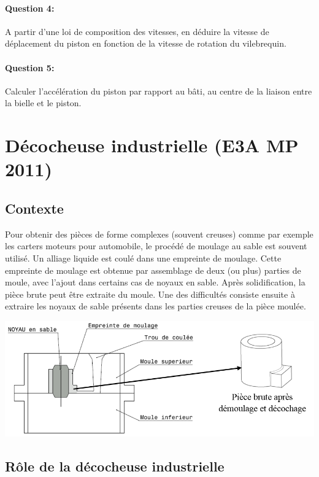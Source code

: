\paragraph{Question 4:} A partir d'une loi de composition des vitesses, en déduire la vitesse de déplacement du piston en fonction de la vitesse de rotation du vilebrequin.

\paragraph{Question 5:} Calculer l'accélération du piston par rapport au bâti, au centre de la liaison entre la bielle et le piston.

\newpage

\section{Décocheuse industrielle (E3A MP 2011)}

\subsection{Contexte}

Pour obtenir des pièces de forme complexes (souvent creuses) comme par exemple les carters moteurs pour automobile, le procédé de moulage au sable est souvent utilisé. Un alliage liquide est coulé dans une empreinte de moulage. Cette empreinte de moulage est obtenue par assemblage de deux (ou plus) parties de moule, avec l'ajout dans certains cas de noyaux en sable. Après solidification, la pièce brute peut être extraite du moule. Une des difficultés consiste ensuite à extraire les noyaux de sable présents dans les parties creuses de la pièce moulée.

\begin{center}
	\includegraphics[width=0.7\linewidth]{img/04}
\end{center}

\subsection{Rôle de la décocheuse industrielle}

